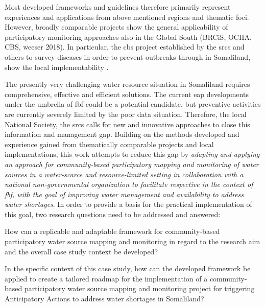 Most developed frameworks and guidelines therefore primarily represent experiences and applications from above mentioned regions and thematic foci. However, broadly comparable projects show the general applicability of participatory monitoring approaches also in the Global South (BRCiS, OCHA, CBS, weeser 2018). In particular, the \acrlong{cbs} project established by the \acrshort{srcs} and others to survey diseases in order to prevent outbreaks through  in Somaliland, show the local implementability \autocite{ifrcCommunityBasedSurveillanceGuiding2017,scrsFeasibilityStudyPotential2022}.\newline


The presently very challenging water resource situation in Somaliland requires comprehensive, effective and efficient solutions. The current \acrlong{eap} developments under the umbrella of \acrshort{fbf} could be a potential candidate, but preventive activities are currently severely limited by the poor data situation. Therefore, the local National Society, the \acrfull{srcs} calls for new and innovative approaches to close this information and management gap. Building on the methods developed and experience gained from thematically comparable projects and local implementations, this work attempts to reduce this gap by \textit{adapting and applying an approach for community-based participatory mapping and monitoring of water sources in a water-scarce and resource-limited setting in collaboration with a national non-governmental organization to facilitate respective  in the context of \acrlong{fbf}, with the goal of improving water management and availability to address water shortages}. In order to provide a basis for the practical implementation of this goal, two research questions need to be addressed and answered:

\begin{questions}
    \item How can a replicable and adaptable framework for community-based participatory water source mapping and monitoring in regard to the research aim and the overall case study context be developed?
    \item In the specific context of this case study, how can the developed framework be applied to create a tailored roadmap for the implementation of a community-based participatory water source mapping and monitoring project for triggering Anticipatory Actions to address water shortages in Somaliland?
\end{questions}

